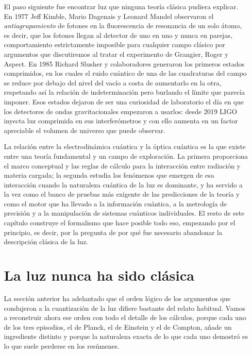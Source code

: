     El paso siguiente fue encontrar luz que ninguna teoría clásica pudiera explicar. En 1977 Jeff Kimble, Mario Dagenais y Leonard Mandel observaron el \textit{antiagrupamiento} de fotones en la fluorescencia de resonancia de un solo átomo, es decir, que los fotones llegan al detector de uno en uno y nunca en parejas, comportamiento estrictamente imposible para cualquier campo clásico por argumentos que discutiremos al tratar el experimento de Grangier, Roger y Aspect. En 1985 Richard Slusher y colaboradores generaron los primeros estados comprimidos, en los cuales el ruido cuántico de una de las cuadraturas del campo se reduce por debajo del nivel del vacío a costa de aumentarlo en la otra, respetando así la relación de indeterminación pero burlando el límite que parecía imponer. Esos estados dejaron de ser una curiosidad de laboratorio el día en que los detectores de ondas gravitacionales empezaron a usarlos: desde 2019 LIGO inyecta luz comprimida en sus interferómetros y con ello aumenta en un factor apreciable el volumen de universo que puede observar.

    La relación entre la electrodinámica cuántica y la óptica cuántica es la que existe entre una teoría fundamental y un campo de exploración. La primera proporciona el marco conceptual y las reglas de cálculo para la interacción entre radiación y materia cargada; la segunda estudia los fenómenos que emergen de esa interacción cuando la naturaleza cuántica de la luz es dominante, y ha servido a la vez como el banco de pruebas más exigente de las predicciones de la teoría y como el motor que ha llevado a la información cuántica, a la metrología de precisión y a la manipulación de sistemas cuánticos individuales. El resto de este capítulo construye el formalismo que hace posible todo eso, empezando por el principio, es decir, por la pregunta de por qué fue necesario abandonar la descripción clásica de la luz.

\section{La luz nunca ha sido clásica}

    La sección anterior ha adelantado que el orden lógico de los argumentos que condujeron a la cuantización de la luz difiere bastante del relato habitual. Vamos a reconstruir ahora ese orden con todo el detalle de los cálculos, porque cada uno de los tres episodios, el de Planck, el de Einstein y el de Compton, añade un ingrediente distinto y porque la naturaleza exacta de lo que cada uno demostró es lo que suele perderse en los resúmenes.

